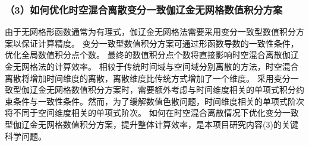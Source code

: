 \subsubsection*{\bfseries （3）如何优化时空混合离散变分一致伽辽金无网格数值积分方案}
由于无网格形函数通常为有理式，伽辽金无网格法需要采用变分一致型数值积分方案以保证计算精度。
变分一致型数值积分方案可通过形函数导数的一致性条件，优化全局数值积分点个数。
最终的数值积分点个数将直接影响时空混合离散伽辽金无网格法的计算效率。
相较于传统时间域与空间域分别离散的方法，时空混合离散将增加时间维度的离散，离散维度比传统方式增加了一个维度。
采用变分一致型伽辽金无网格数值积分方案时，需要额外考虑与时间维度相关的单项式积分约束条件与一致性条件。然而，为了缓解数值色散问题，时间维度相关的单项式阶次将不同于空间维度相关的单项式阶次。
如何在时空混合离散情况下优化变分一致型伽辽金无网格数值积分方案，提升整体计算效率，是本项目研究内容(3)的关键科学问题。


